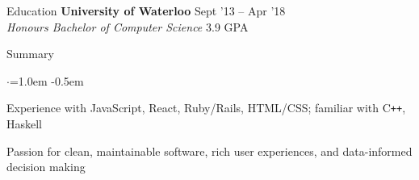 \documentclass{resume} %
\begin{document}

\begin{rSection}{Education}
  {\bf University of Waterloo} \hfill {Sept '13 -- Apr '18} \\
  {\em Honours Bachelor of Computer Science} \hfill {3.9 GPA}
\end{rSection}

\vspace{0.5em}


\begin{rSection}{Summary}
  \vspace {0.5em}
  \begin{list}{$\cdot$}{\leftmargin=1.0em}
    \itemsep -0.5em \vspace{-0.5em}
    \item Experience with JavaScript, React, Ruby/Rails, HTML/CSS; familiar with C\texttt{++}, Haskell
    \item Passion for clean, maintainable software, rich user experiences, and data-informed decision making
  \end{list}
  \vspace{0.5em}
\end{rSection}

\end{document}
